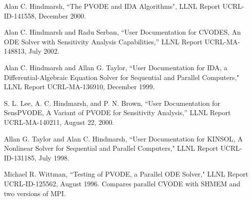\documentclass[11pt]{article}
\begin{document}
\begin{thebibliography}{99}
Alan C. Hindmarsh, ``The PVODE and IDA Algorithms", LLNL Report
UCRL-ID-141558, December 2000.

Alan C. Hindmarsh and Radu Serban, ``User Documentation for
CVODES, An ODE Solver with Sensitivity Analysis Capabilities,''
LLNL Report UCRL-MA-148813, July 2002.

Alan C. Hindmarsh and Allan G. Taylor, ``User Documentation for IDA,
a Differential-Algebraic Equation Solver for Sequential and Parallel
Computers," LLNL Report UCRL-MA-136910, December 1999.

S. L. Lee, A. C. Hindmarsh, and P. N. Brown, ``User Documentation for
SensPVODE, A Variant of PVODE for Sensitivity Analysis,'' LLNL
Report UCRL-MA-140211, August 22, 2000.

Allan G. Taylor and Alan C. Hindmarsh, ``User Documentation for KINSOL,
A Nonlinear Solver for Sequential and Parallel Computers," LLNL Report
UCRL-ID-131185, July 1998.

Michael R. Wittman, ``Testing of PVODE, a Parallel ODE Solver,"
LLNL Report UCRL-ID-125562, August 1996.  Compares parallel CVODE with
SHMEM and two versions of MPI.

\end{thebibliography}
\end{document}
